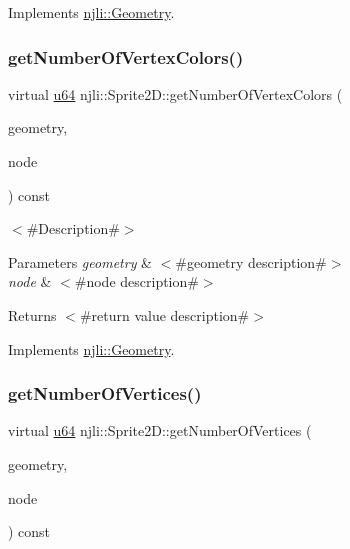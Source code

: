 Implements \mbox{\hyperlink{classnjli_1_1_geometry_a495713b5eea24429df8899cfaa59c832}{njli\+::\+Geometry}}.

\mbox{\label{classnjli_1_1_sprite2_d_a2ecb47d5889333f482406230fe470e34}} 
\subsubsection{\texorpdfstring{get\+Number\+Of\+Vertex\+Colors()}{getNumberOfVertexColors()}}
{\footnotesize\ttfamily virtual \mbox{\hyperlink{_util_8h_ad758b7a5c3f18ed79d2fcd23d9f16357}{u64}} njli\+::\+Sprite2\+D\+::get\+Number\+Of\+Vertex\+Colors (\begin{DoxyParamCaption}\item[{\mbox{\hyperlink{classnjli_1_1_level_of_detail}{Level\+Of\+Detail}} $\ast$}]{geometry,  }\item[{\mbox{\hyperlink{classnjli_1_1_node}{Node}} $\ast$}]{node }\end{DoxyParamCaption}) const\hspace{0.3cm}{\ttfamily [virtual]}}

$<$\#\+Description\#$>$


\begin{DoxyParams}{Parameters}
{\em geometry} & $<$\#geometry description\#$>$ \\
\hline
{\em node} & $<$\#node description\#$>$\\
\hline
\end{DoxyParams}
\begin{DoxyReturn}{Returns}
$<$\#return value description\#$>$ 
\end{DoxyReturn}


Implements \mbox{\hyperlink{classnjli_1_1_geometry_a224b18abc15b88b556e6b71bb89ecf73}{njli\+::\+Geometry}}.

\mbox{\label{classnjli_1_1_sprite2_d_a96d489e0131032c64a150cd1629fd0e5}} 
\subsubsection{\texorpdfstring{get\+Number\+Of\+Vertices()}{getNumberOfVertices()}}
{\footnotesize\ttfamily virtual \mbox{\hyperlink{_util_8h_ad758b7a5c3f18ed79d2fcd23d9f16357}{u64}} njli\+::\+Sprite2\+D\+::get\+Number\+Of\+Vertices (\begin{DoxyParamCaption}\item[{\mbox{\hyperlink{classnjli_1_1_level_of_detail}{Level\+Of\+Detail}} $\ast$}]{geometry,  }\item[{\mbox{\hyperlink{classnjli_1_1_node}{Node}} $\ast$}]{node }\end{DoxyParamCaption}) const\hspace{0.3cm}{\ttfamily [virtual]}}

